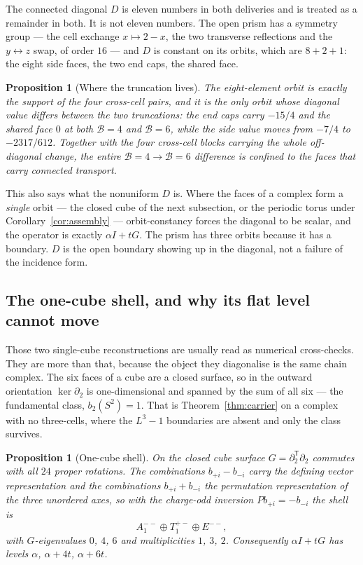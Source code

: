 \documentclass[11pt]{article}
\theoremstyle{plain}
\newtheorem{proposition}[theorem]{Proposition}
\theoremstyle{definition}
\theoremstyle{remark}
\newcommand{\chk}[1]{}
\begin{document}
The connected diagonal $D$ is eleven numbers in both deliveries and is treated
as a remainder in both. It is not eleven numbers. The open prism has a symmetry
group --- the cell exchange $x\mapsto2-x$, the two transverse reflections and
the $y\leftrightarrow z$ swap, of order $16$ --- and $D$ is constant on its
orbits, which are $8+2+1$: the eight side faces, the two end caps, the shared
face.

\begin{proposition}[Where the truncation lives]\label{prop:orbit}
The eight-element orbit is exactly the support of the four cross-cell pairs,
and it is the only orbit whose diagonal value differs between the two
truncations: the end caps carry $-15/4$ and the shared face $0$ at both
$\mathcal B=4$ and $\mathcal B=6$, while the side value moves from $-7/4$ to
$-2317/612$. Together with
the four cross-cell blocks carrying the whole off-diagonal change, the entire
$\mathcal B=4\to\mathcal B=6$ difference is confined to the faces that carry connected transport.
\end{proposition}
\chk{the connected diagonal is orbit-constant, and only the transporting orbit moves}

This also says what the nonuniform $D$ is. Where the faces of a complex form a
\emph{single} orbit --- the closed cube of the next subsection, or the periodic
torus under Corollary~\ref{cor:assembly} --- orbit-constancy forces the diagonal to
be scalar, and the operator is exactly $\alpha I+tG$. The prism has three
orbits because it has a boundary. $D$ is the open boundary showing up in the
diagonal, not a failure of the incidence form.

\subsection{The one-cube shell, and why its flat level cannot move}

Those two single-cube reconstructions are usually read as numerical
cross-checks. They are more than that, because the object they diagonalise is
the same chain complex. The six faces of a cube are a closed surface, so in the
outward orientation $\ker\partial_2$ is one-dimensional and spanned by the sum
of all six --- the fundamental class, $b_2(S^2)=1$. That is
Theorem~\ref{thm:carrier} on a complex with no three-cells, where the $L^3-1$
boundaries are absent and only the class survives.

\begin{proposition}[One-cube shell]\label{prop:cube}
On the closed cube surface $G=\partial_2^{\mathsf T}\partial_2$ commutes with
all $24$ proper rotations. The combinations $b_{+i}-b_{-i}$ carry the defining
vector representation and the combinations $b_{+i}+b_{-i}$ the permutation
representation of the three unordered axes, so with the charge-odd inversion
$Pb_{+i}=-b_{-i}$ the shell is
\[
  A_1^{--}\oplus T_1^{+-}\oplus E^{--},
\]
with $G$-eigenvalues $0$, $4$, $6$ and multiplicities $1$, $3$, $2$.
Consequently $\alpha I+tG$ has levels $\alpha$, $\alpha+4t$, $\alpha+6t$.
\end{proposition}
\end{document}
